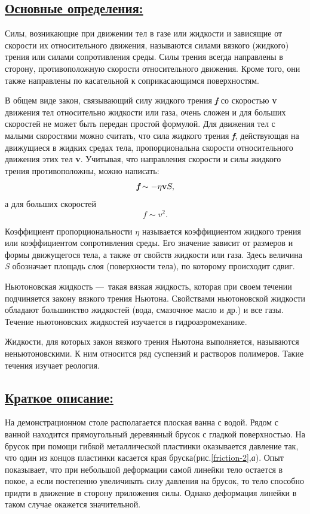 \documentclass[14pt,a4paper,oneside]{extarticle}	%
\begin{document}
	\newpage	
	\subsection*{\underline{Основные определения:}}
	
	Силы, возникающие при движении тел в газе или жидкости 
	и зависящие от скорости их относительного движения, называются 
	силами вязкого (жидкого) трения или силами сопротивления среды. 
	Силы трения всегда направлены в сторону, противоположную скорости относительного 
	движения.
	Кроме того, они также направлены по касательной к соприкасающимся поверхностям.
		
	В общем виде закон, связывающий силу жидкого трения \textbf{\textit{f}} со 
	скоростью \textbf{v} движения тел относительно жидкости или газа, очень 
	сложен и для больших скоростей не может быть передан простой 
	формулой. 
	Для движения тел с малыми скоростями можно считать, что сила жидкого трения \textit{\textbf{f}}, действующая на движущиеся в жидких средах тела, пропорциональна скорости относительного движения этих тел \textbf{v}.
	Учитывая, что направления скорости и силы жидкого трения противоположны, можно написать: 
$$
	\textit{\textbf{f}} \sim - \eta \textbf{v}S,
$$
	а для больших скоростей 
$$
	f \sim v^2.
$$
	
	Коэффициент пропорциональности $ \eta $ называется коэффициентом жидкого трения или коэффициентом сопротивления среды. 
	Его значение зависит от размеров и формы движущегося тела, а также от свойств жидкости или газа.
	Здесь величина \textit{S} обозначает площадь слоя (поверхности тела), по которому происходит сдвиг.
	
	Ньютоновская жидкость — такая вязкая жидкость, которая при своем течении подчиняется закону вязкого трения Ньютона. 
	Свойствами ньютоновской жидкости обладают большинство жидкостей (вода, смазочное масло и др.) и все газы. 
	Течение ньютоновских жидкостей изучается в гидроаэромеханике. 
	
	Жидкости, для которых закон вязкого трения Ньютона выполняется,	называются неньютоновскими.
	К ним относится ряд суспензий и растворов полимеров. 
	Такие течения изучает реология.

	\newpage	
	\subsection*{\underline{Краткое описание:}}
	
	На демонстрационном столе располагается плоская ванна с водой.
	Рядом с ванной находится прямоугольный деревянный брусок с гладкой поверхностью.
	На брусок при помощи гибкой металлической пластинки оказывается давление так, что один из концов пластинки касается края бруска(рис.\ref{friction-2},\textit{а}).
	Опыт показывает, что при небольшой деформации самой линейки тело остается в покое, 
	а если постепенно увеличивать силу давления на брусок, то тело способно придти в движение в сторону приложения силы.
	Однако деформация линейки в таком случае окажется значительной.
		
\end{document}
